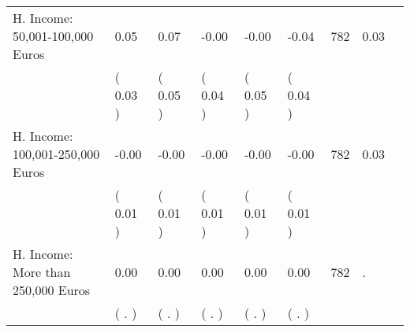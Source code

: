 \begin{tabular}{L{6.2cm} C{1.8cm} C{1.8cm} C{1.8cm} C{1.8cm} C{1.8cm} C{1.8cm} C{0.3cm} C{0.3cm}}
H. Income: 50,001-100,000 Euros &      0.05 &      0.07 &     -0.00 &     -0.00 &     -0.04  & 782 &       0.03 \\ 
 & (     0.03 ) & (     0.05 ) & (     0.04 ) & (     0.05 ) & (     0.04 )  & \\
H. Income: 100,001-250,000 Euros &     -0.00 &     -0.00 &     -0.00 &     -0.00 &     -0.00  & 782 &       0.03 \\ 
 & (     0.01 ) & (     0.01 ) & (     0.01 ) & (     0.01 ) & (     0.01 )  & \\
H. Income: More than 250,000 Euros &      0.00 &      0.00 &      0.00 &      0.00 &      0.00  & 782 &          . \\ 
 & (        . ) & (        . ) & (        . ) & (        . ) & (        . )  & \\
\bottomrule
\end{tabular}
